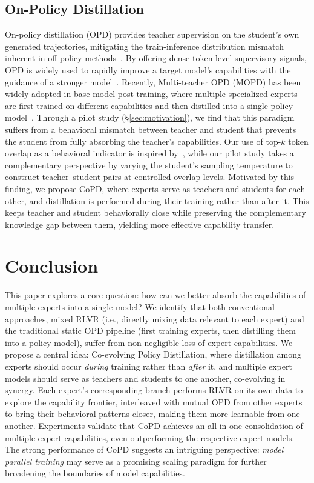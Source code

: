 \documentclass{llmxive}
\begin{document}
\subsection{On-Policy Distillation}
On-policy distillation (OPD) provides teacher supervision on the student's own generated trajectories, mitigating the train-inference distribution mismatch inherent in off-policy methods~\cite{agarwal2024gkd,gu2026minillmonpolicydistillationlarge}. By offering dense token-level supervisory signals, OPD is widely used to rapidly improve a target model's capabilities with the guidance of a stronger model~\cite{lu2025onpolicy-opd, yang2025qwen3technicalreport, zhao2026opsd, hbotter2026reinforcementlearningselfdistillation_sdpo}. Recently, Multi-teacher OPD (MOPD) has been widely adopted in base model post-training, where multiple specialized experts are first trained on different capabilities and then distilled into a single policy model~\cite{mimo2025flash-mopd,deepseekai2026deepseekv4,yang2025qwen3technicalreport}. 
Through a pilot study (\S\ref{sec:motivation}), we find that this paradigm suffers from a behavioral mismatch between teacher and student that prevents the student from fully absorbing the teacher's capabilities. Our use of top-$k$ token overlap as a behavioral indicator is inspired by~\citet{li2026rethinkingonpolicydistillationlarge}, while our pilot study takes a complementary perspective by varying the student's sampling temperature to construct teacher--student pairs at controlled overlap levels. Motivated by this finding, we propose CoPD, where experts serve as teachers and students for each other, and distillation is performed during their training rather than after it. This keeps teacher and student behaviorally close while preserving the complementary knowledge gap between them, yielding more effective capability transfer.

\section{Conclusion}
This paper explores a core question: how can we better absorb the capabilities of multiple experts into a single model? We identify that both conventional approaches, mixed RLVR (i.e., directly mixing data relevant to each expert) and the traditional static OPD pipeline (first training experts, then distilling them into a policy model), suffer from non-negligible loss of expert capabilities. We propose a central idea: Co-evolving Policy Distillation, where distillation among experts should occur \textit{during} training rather than \textit{after} it, and multiple expert models should serve as teachers and students to one another, co-evolving in synergy. Each expert's corresponding branch performs RLVR on its own data to explore the capability frontier, interleaved with mutual OPD from other experts to bring their behavioral patterns closer, making them more learnable from one another. Experiments validate that CoPD achieves an all-in-one consolidation of multiple expert capabilities, even outperforming the respective expert models. The strong performance of CoPD suggests an intriguing perspective: \textit{model parallel training} may serve as a promising scaling paradigm for further broadening the boundaries of model capabilities.
\end{document}
